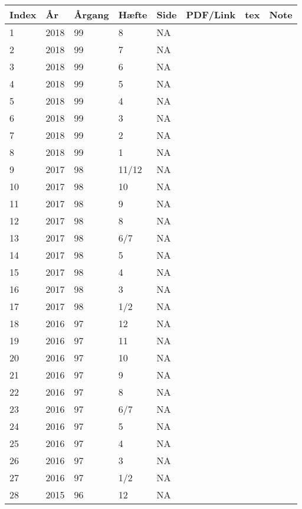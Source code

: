 \begin{longtable}{ |l|l|l|l|l|l|l|l| }
Index & År & Årgang & Hæfte & Side & PDF/Link & tex & Note \\
\hline
\endhead %
  1 & 2018 & 99 & 8     &      NA &  &  & \\
  2 & 2018 & 99 & 7     &      NA &  &  & \\
  3 & 2018 & 99 & 6     &      NA &  &  & \\
  4 & 2018 & 99 & 5     &      NA &  &  & \\
  5 & 2018 & 99 & 4     &      NA &  &  & \\
  6 & 2018 & 99 & 3     &      NA &  &  & \\
  7 & 2018 & 99 & 2     &      NA &  &  & \\
  8 & 2018 & 99 & 1     &      NA &  &  & \\
  9 & 2017 & 98 & 11/12 &      NA &  &  & \\
 10 & 2017 & 98 & 10    &      NA &  &  & \\
 11 & 2017 & 98 & 9     &      NA &  &  & \\
 12 & 2017 & 98 & 8     &      NA &  &  & \\
 13 & 2017 & 98 & 6/7   &      NA &  &  & \\
 14 & 2017 & 98 & 5     &      NA &  &  & \\
 15 & 2017 & 98 & 4     &      NA &  &  & \\
 16 & 2017 & 98 & 3     &      NA &  &  & \\
 17 & 2017 & 98 & 1/2   &      NA &  &  & \\
 18 & 2016 & 97 & 12    &      NA &  &  & \\
 19 & 2016 & 97 &    11 &      NA &  &  & \\
 20 & 2016 & 97 &    10 &      NA &  &  & \\
 21 & 2016 & 97 &     9 &      NA &  &  & \\
 22 & 2016 & 97 &     8 &      NA &  &  & \\
 23 & 2016 & 97 &   6/7 &      NA &  &  & \\
 24 & 2016 & 97 &     5 &      NA &  &  & \\
 25 & 2016 & 97 &     4 &      NA &  &  & \\
 26 & 2016 & 97 &     3 &      NA &  &  & \\
 27 & 2016 & 97 &   1/2 &      NA &  &  & \\
 28 & 2015 & 96 &    12 &      NA &  &  & \\

\end{longtable}
